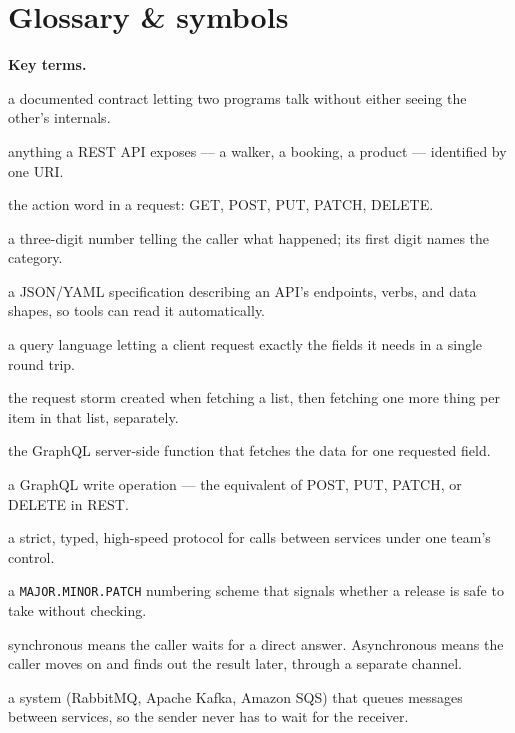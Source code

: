 \documentclass[a4paper,11pt]{article}
\begin{document}
\section*{Glossary \& symbols}
\noindent\textbf{Key terms.}
\begin{description}[leftmargin=10em,style=nextline,font=\normalfont\bfseries\color{accent}]
  \item[API] a documented contract letting two programs talk without either
        seeing the other's internals.
  \item[resource] anything a REST API exposes --- a walker, a booking, a
        product --- identified by one URI.
  \item[verb] the action word in a request: GET, POST, PUT, PATCH, DELETE.
  \item[status code] a three-digit number telling the caller what happened;
        its first digit names the category.
  \item[OpenAPI] a JSON/YAML specification describing an API's endpoints,
        verbs, and data shapes, so tools can read it automatically.
  \item[GraphQL] a query language letting a client request exactly the
        fields it needs in a single round trip.
  \item[N+1 problem] the request storm created when fetching a list, then
        fetching one more thing per item in that list, separately.
  \item[resolver] the GraphQL server-side function that fetches the data
        for one requested field.
  \item[mutation] a GraphQL write operation --- the equivalent of
        POST, PUT, PATCH, or DELETE in REST.
  \item[gRPC] a strict, typed, high-speed protocol for calls between
        services under one team's control.
  \item[semantic versioning] a \texttt{MAJOR.MINOR.PATCH} numbering scheme
        that signals whether a release is safe to take without checking.
  \item[synchronous / asynchronous] synchronous means the caller waits
        for a direct answer. Asynchronous means the caller moves on and
        finds out the result later, through a separate channel.
  \item[message broker] a system (RabbitMQ, Apache Kafka, Amazon SQS)
        that queues messages between services, so the sender never has to
        wait for the receiver.

\end{description}
\end{document}
